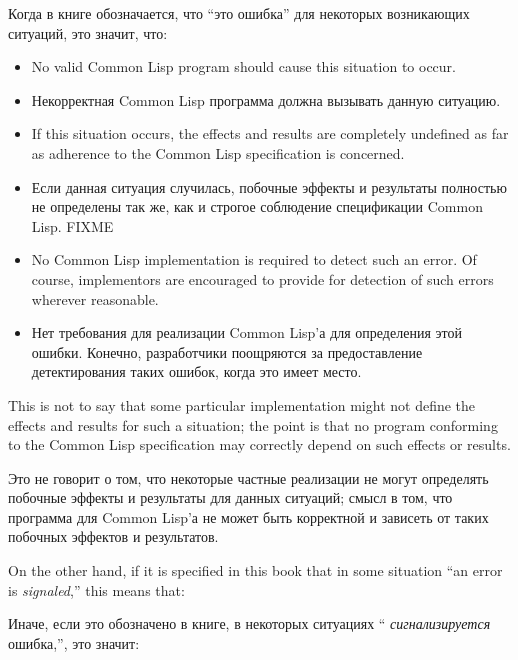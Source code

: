 Когда в книге обозначается, что ``это ошибка'' для некоторых возникающих
ситуаций, это значит, что: 
\begin{itemize}
\item No valid Common Lisp program should cause this situation to occur.

\item Некорректная Common Lisp программа должна вызывать данную ситуацию.

\item If this situation occurs, the effects and results are completely
undefined as far as adherence to the Common Lisp specification is concerned.

\item Если данная ситуация случилась, побочные эффекты и результаты полностью не
определены так же, как и строгое соблюдение спецификации Common Lisp. FIXME

\item No Common Lisp implementation is required to detect such an error.
Of course, implementors are encouraged to provide for detection
of such errors wherever reasonable.

\item Нет требования для реализации Common Lisp'а для определения этой
ошибки. Конечно, разработчики поощряются за предоставление детектирования таких
ошибок, когда это имеет место.
\end{itemize}
This is not to say that some particular implementation might not define
the effects and results for such a situation; the point is that no program
conforming to the Common Lisp specification may correctly depend on such
effects or results.

Это не говорит о том, что некоторые частные реализации не могут определять
побочные эффекты и результаты для данных ситуаций; смысл в том, что программа для
Common Lisp'а не может быть корректной и зависеть от таких побочных эффектов и результатов.

On the other hand, if it is specified in this book that in some situation
``an error is {\it signaled},'' this means that:

Иначе, если это обозначено в книге, в некоторых ситуациях ``{\it
сигнализируется} ошибка,'', это значит:

